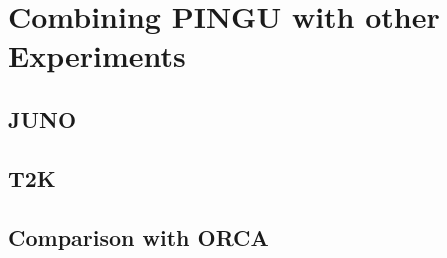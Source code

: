 \section{Combining PINGU with other Experiments}
\label{sec:comb}


\subsection{JUNO}
\label{sec:JUNO}


\subsection{T2K}
\label{sec:T2K}


\subsection{Comparison with ORCA}
\label{sec:ORCA}